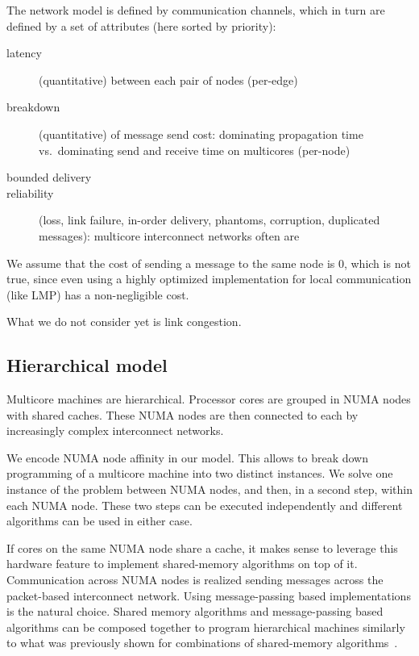 \documentclass{article}
\begin{document}
The network model is defined by communication channels, which in turn
are defined by a set of attributes (here sorted by priority):

\begin{description}
\item[latency] (quantitative) between each pair of nodes (per-edge)
\item[breakdown] (quantitative) of message send cost:
  dominating propagation time vs.\ dominating send and receive time on
  multicores (per-node)
\item[bounded delivery]
\item[reliability] (loss, link failure, in-order delivery, phantoms,
  corruption, duplicated messages): 
  multicore interconnect networks often are
\end{description}

We assume that the cost of sending a message to the same node is 0,
which is not true, since even using a highly optimized implementation
for local communication (like LMP) has a non-negligible cost.

What we do not consider yet is link congestion. 

\subsection{Hierarchical model}
\label{sec:model_hierarchy}

Multicore machines are hierarchical. Processor cores are grouped in
NUMA nodes with shared caches. These NUMA nodes are then connected to
each by increasingly complex interconnect networks. 

We encode NUMA node affinity in our model. This allows to break down
programming of a multicore machine into two distinct instances. We
solve one instance of the problem between NUMA nodes, and then, in a
second step, within each NUMA node. These two steps can be executed
independently and different algorithms can be used in either case.

If cores on the same NUMA node share a cache, it makes sense to
leverage this hardware feature to implement shared-memory algorithms
on top of it. %
Communication across NUMA nodes is realized sending messages across
the packet-based interconnect network. Using message-passing based
implementations is the natural choice. %
Shared memory algorithms and message-passing based algorithms can be
composed together to program hierarchical machines similarly to what
was previously shown for combinations of shared-memory
algorithms~\cite{Alistarh2012}.
\end{document}
